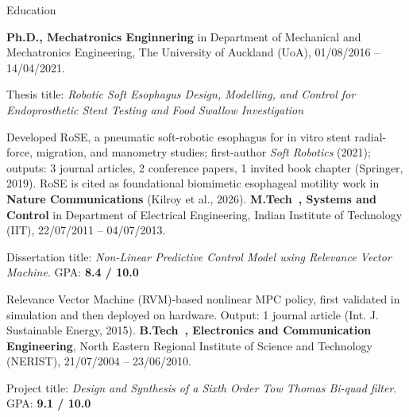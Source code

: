 \begin{rubric}{Education}

	\entry*[2016 -- 2021]%
		\textbf{Ph.D., Mechatronics Enginnering} in Department of Mechanical and Mechatronics Engineering, The University of Auckland (UoA), 01/08/2016 -- 14/04/2021.
		\par Thesis title: \emph{Robotic Soft Esophagus Design, Modelling, and Control for Endoprosthetic Stent Testing and Food Swallow Investigation}
		\par Developed RoSE, a pneumatic soft-robotic esophagus for in vitro stent radial-force, migration, and manometry studies; first-author \textit{Soft Robotics} (2021); outputs: 3 journal articles, 2 conference papers, 1 invited book chapter (Springer, 2019). RoSE is cited as foundational biomimetic esophageal motility work in \textbf{Nature Communications} (Kilroy et al., 2026).
	\entry*[2011 -- 2013]%
		\textbf{M.Tech~, Systems and Control} in Department of Electrical Engineering, Indian Institute of Technology (IIT), 22/07/2011 -- 04/07/2013.\par
		Dissertation title: \emph{Non-Linear Predictive Control Model using Relevance Vector Machine}.
		GPA: {\bf 8.4 / 10.0}
		\par Relevance Vector Machine (RVM)-based nonlinear MPC policy, first validated in simulation and then deployed on hardware. Output: 1 journal article (Int. J. Sustainable Energy, 2015).
	\entry*[2004 -- 2010]%
		\textbf{B.Tech~, Electronics and Communication Engineering}, North Eastern Regional Institute of Science and Technology (NERIST), 21/07/2004 -- 23/06/2010.\par
		Project title: \emph{Design and Synthesis of a Sixth Order Tow Thomas Bi-quad filter}.
		GPA: \bf 9.1 / 10.0
		
	\end{rubric}
	
	